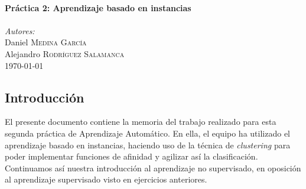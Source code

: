 \documentclass[12pt]{article}
\begin{document}
\begin{titlepage}
\HRule \\[0.7cm]
{ \huge \bfseries Práctica 2: Aprendizaje basado en instancias}\\[0.4cm] %
\HRule \\[0.7cm]


\emph{Autores:}\\
Daniel \textsc{Medina García}\\ %
Alejandro \textsc{Rodríguez Salamanca}\\[1.1cm] %


{\large \today}\\ %


\vfill %

\end{titlepage}

\tableofcontents

\newpage
\thispagestyle{empty}
\clearpage
\vspace*{\fill}
\begin{center}
    \begin{minipage}{\textwidth}
        \begin{center}
            \section*{Introducción}
            El presente documento contiene la memoria del trabajo realizado para esta segunda práctica de Aprendizaje Automático. En ella, el equipo ha utilizado el aprendizaje basado en instancias, haciendo uso de la técnica de \emph{clustering} para poder implementar funciones de afinidad y agilizar así la clasificación. Continuamos así nuestra introducción al aprendizaje no supervisado, en oposición al aprendizaje supervisado visto en ejercicios anteriores.
        \end{center}
    \end{minipage}
\end{center}
\vfill
\end{document}
